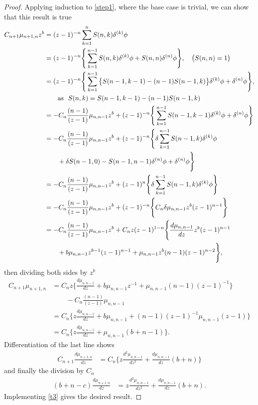 \documentclass[12pt]{article}
\numberwithin{figure}{section}
\numberwithin{equation}{section}
\numberwithin{table}{section}
\begin{document}
\begin{proof}
Applying induction to \eqref{step1}, where the base case is trivial, we can show that this result is true
\begin{align*}
C_{n+1} \mu_{n+1,n}z^b&=(z-1)^{-n}\sum^{n}_{k=1}S(n,k)\delta^{(k)}\phi\\
&=(z-1)^{-n}\Bigg\{\sum^{n-1}_{k=1}S(n,k)\delta^{(k)}\phi+S(n,n)\delta^{(n)}\phi\Bigg\},~~~\big(S(n,n)=1\big)\\
&=(z-1)^{-n}\Bigg\{\sum^{n-1}_{k=1}\big\{S(n-1,k-1)-(n-1)S(n-1,k)\big\}\delta^{(k)}\phi+\delta^{(n)}\phi\Bigg\},\\
&\qquad {\rm{as}}~~ S(n,k)=S(n-1,k-1)-(n-1)S(n-1,k)\\
&=-C_n\frac{(n-1)}{(z-1)}\mu_{n,n-1}z^b+(z-1)^{-n}\Bigg\{\sum^{n-1}_{k=1}S(n-1,k-1)\delta^{(k)}\phi+\delta^{(n)}\phi\Bigg\}\\
&=-C_n\frac{(n-1)}{(z-1)}\mu_{n,n-1}z^b+(z-1)^{-n}\Bigg\{\delta\sum^{n-1}_{k=1}S(n-1,k)\delta^{(k)}\phi\\
&\qquad+\delta S(n-1,0)-S(n-1,n-1)\delta^{(n)}\phi+\delta^{(n)}\phi\Bigg\}\\
&=-C_n\frac{(n-1)}{(z-1)}\mu_{n,n-1}z^b+(z-1)^{n}\Bigg\{\delta\sum^{n-1}_{k=1}S(n-1,k)\delta^{(k)}\phi\Bigg\}\\
&=-C_n\frac{(n-1)}{(z-1)}\mu_{n,n-1}z^b+(z-1)^{-n}\Bigg\{C_n\delta\mu_{n,n-1}z^b(z-1)^{n-1}\Bigg\}\\
&=-C_n\frac{(n-1)}{(z-1)}\mu_{n,n-1}z^b+C_nz(z-1)^{1-n}\Bigg\{\frac{d\mu_{n,n-1}}{dz}z^b(z-1)^{n-1}\\
&\qquad+b\mu_{n,n-1}z^{b-1}(z-1)^{n-1}+\mu_{n,n-1}z^b(n-1)(z-1)^{n-2}\Bigg\},
\end{align*}
then dividing both sides by $z^b$
\begin{align*}
C_{n+1}\mu_{n+1,n}&=C_nz\Bigg\{\frac{d\mu_{n,n-1}}{dz}+b\mu_{n,n-1}z^{-1}+\mu_{n,n-1}(n-1)(z-1)^{-1}\Bigg\}\\
&\qquad-C_n\frac{(n-1)}{(z-1)}\mu_{n,n-1}\\
&=C_n\Bigg\{z\frac{d\mu_{n,n-1}}{dz}+b\mu_{n,n-1}+(n-1)(z-1)^{-1}\mu_{n,n-1}(z-1)\Bigg\}\\
&=C_n\Bigg\{z\frac{d\mu_{n,n-1}}{dz}+\mu_{n,n-1}(b+n-1)\Bigg\}.
\end{align*}
Differentiation of the last line shows
\begin{align*}
C_{n+1}\frac{d\mu_{n+1,n}}{dz}&=C_n\Bigg\{z\frac{d^2\mu_{n,n-1}}{dz^2}+\frac{d\mu_{n,n-1}}{dz}(b+n)\Bigg\}
\end{align*}
and finally the division by $C_n$
\begin{align*}
(b+n-c)\frac{d\mu_{n+1,n}}{dz}&=z\frac{d^2\mu_{n,n-1}}{dz^2}+\frac{d\mu_{n,n-1}}{dz}(b+n).
\end{align*}
Implementing \eqref{t3} gives the desired result.


\end{proof}
\end{document}
